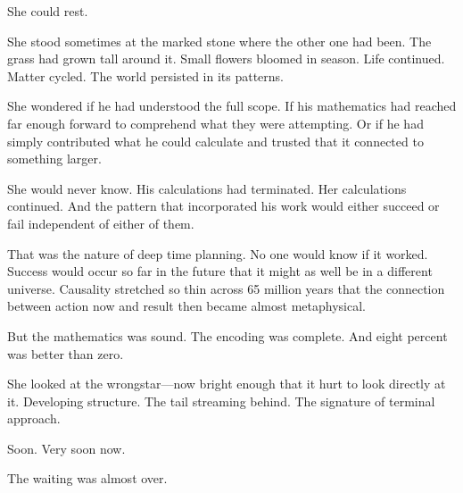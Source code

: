 She could rest.

She stood sometimes at the marked stone where the other one had been. The grass had grown tall around it. Small flowers bloomed in season. Life continued. Matter cycled. The world persisted in its patterns.

She wondered if he had understood the full scope. If his mathematics had reached far enough forward to comprehend what they were attempting. Or if he had simply contributed what he could calculate and trusted that it connected to something larger.

She would never know. His calculations had terminated. Her calculations continued. And the pattern that incorporated his work would either succeed or fail independent of either of them.

That was the nature of deep time planning. No one would know if it worked. Success would occur so far in the future that it might as well be in a different universe. Causality stretched so thin across 65 million years that the connection between action now and result then became almost metaphysical.

But the mathematics was sound. The encoding was complete. And eight percent was better than zero.

She looked at the wrongstar—now bright enough that it hurt to look directly at it. Developing structure. The tail streaming behind. The signature of terminal approach.

Soon. Very soon now.

The waiting was almost over.


